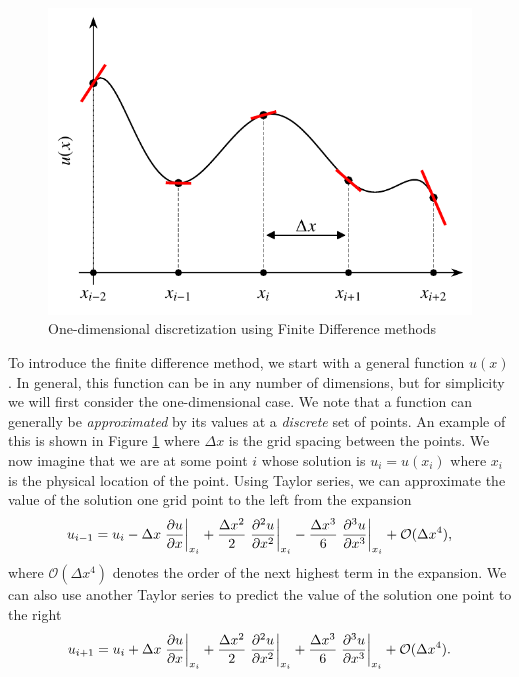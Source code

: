\begin{figure}[htbp]
	\centering
	\includegraphics[width=0.6\linewidth]{Pictures/fd_scheme}
	\caption{One-dimensional discretization using Finite Difference methods}
	\label{fig:fd_scheme}
\end{figure}
	
To introduce the finite difference method, we start with a general function $u(x)$. In general, this function can be in any number of dimensions, but for simplicity we will first consider the one-dimensional case. We note that a function can generally be {\it approximated} by its values at a {\it discrete} set of points. An example of this is shown in Figure \ref{fig:fd_scheme} where $\Delta x$ is the grid spacing between the points. We now imagine that we are at some point $i$ whose solution is $u_i = u(x_i)$ where $x_i$ is the physical location of the point. Using Taylor series, we can approximate the value of the solution one grid point to the left from the expansion
\begin{equation}
	u_{i-1} = u_i - \Delta x \left.\frac{\partial u}{\partial x}\right\rvert_{x_i}^{} + \frac{\Delta x^2}{2} \left.\frac{\partial^2 u}{\partial x^2}\right\rvert_{x_i}^{} - \frac{\Delta x^3}{6} \left.\frac{\partial^3 u}{\partial x^3}\right\rvert_{x_i}^{} + \mathcal{O}(\Delta x^4),
	\label{eqn:fdmup}
\end{equation}
where $\mathcal{O}(\Delta x^4)$ denotes the order of the next highest term in the expansion. We can also use another Taylor series to predict the value of the solution one point to the right
\begin{equation}
	u_{i+1} = u_i + \Delta x \left.\frac{\partial u}{\partial x}\right\rvert_{x_i}^{} + \frac{\Delta x^2}{2} \left.\frac{\partial^2 u}{\partial x^2}\right\rvert_{x_i}^{} + \frac{\Delta x^3}{6} \left.\frac{\partial^3 u}{\partial x^3}\right\rvert_{x_i}^{} + \mathcal{O}(\Delta x^4).
	\label{eqn:fdmdwn}
\end{equation}

